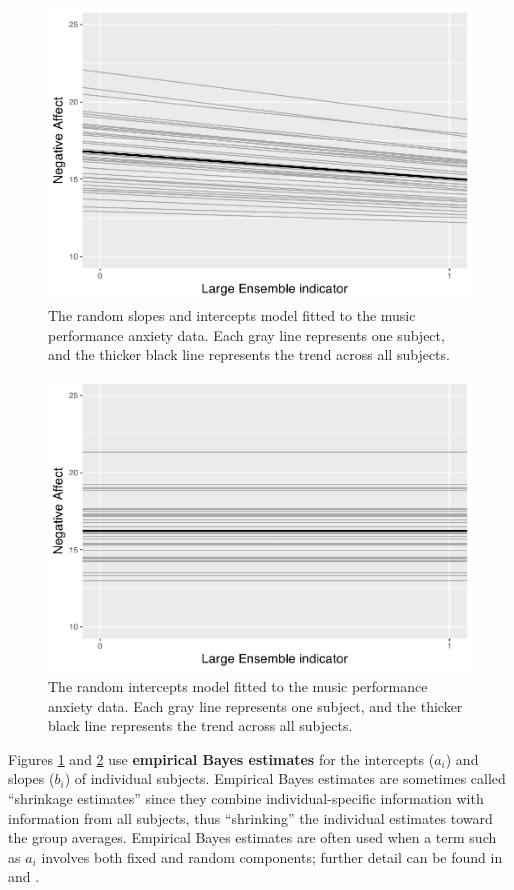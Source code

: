 \documentclass[
]{krantz}
\begin{document}
\begin{figure}

{\centering \includegraphics[width=0.6\linewidth]{bookdown-BeyondMLR_files/figure-latex/mli-spag1-1} 

}

\caption{The random slopes and intercepts model fitted to the music performance anxiety data.  Each gray line represents one subject, and the thicker black line represents the trend across all subjects.}\label{fig:mli-spag1}
\end{figure}

\begin{figure}

{\centering \includegraphics[width=0.6\linewidth]{bookdown-BeyondMLR_files/figure-latex/mli-spag0-1} 

}

\caption{The random intercepts model fitted to the music performance anxiety data.  Each gray line represents one subject, and the thicker black line represents the trend across all subjects.}\label{fig:mli-spag0}
\end{figure}

Figures \ref{fig:mli-spag1} and \ref{fig:mli-spag0} use \textbf{empirical Bayes estimates}  for the intercepts (\(a_{i}\)) and slopes (\(b_{i}\)) of individual subjects. Empirical Bayes estimates are sometimes called ``shrinkage estimates'' since they combine individual-specific information with information from all subjects, thus ``shrinking'' the individual estimates toward the group averages. Empirical Bayes estimates are often used when a term such as \(a_{i}\) involves both fixed and random components; further detail can be found in \citet{Bryk2002} and \citet{Singer2003}.
\end{document}
